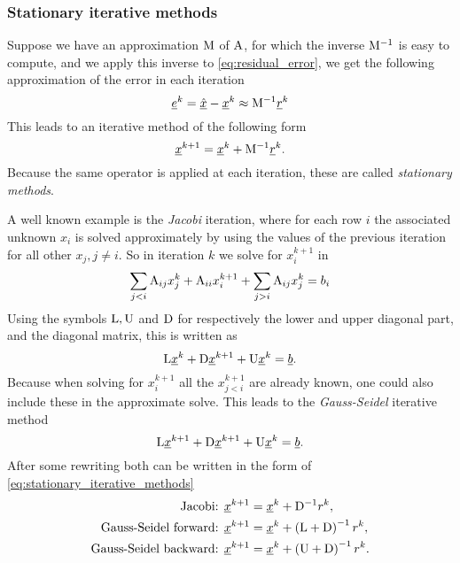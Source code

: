 \subsubsection{Stationary iterative methods} \label{sec:stationary_iterative_methods}
Suppose we have an approximation $\mathrm{M}$ of $\mathrm{A}$, for which 
the inverse $\mathrm{M}^{-1}$ is easy to compute, and we apply this inverse
to \eqref{eq:residual_error}, we get the following approximation of the
error in each iteration
\begin{equation}
  \underline{e}^k=\underline{\hat x}-\underline{x}^k \approx \mathrm{M}^{-1}\underline{r}^k
    \label{eq:iterative_solver_error_estimate}
\end{equation}
This leads to an iterative method of the following form
\begin{equation}\label{eq:stationary_iterative_methods}
  \underline{x}^{k+1}=\underline{x}^{k} + \mathrm{M}^{-1} \underline{r}^{k}.
\end{equation}
Because the same operator is applied at each iteration, these are 
called \emph{stationary methods}.

A well known example is the
\emph{Jacobi} iteration, where for each row $i$ the associated unknown $x_i$ 
is solved approximately by using the values of the previous iteration 
for all other $x_j, j\neq i$. So in iteration $k$ we solve for $x^{k+1}_i$ in
\begin{equation*}
  \sum_{j<i} \mathrm{A}_{ij} x^k_j + \mathrm{A}_{ii} x^{k+1}_i +
  \sum_{j>i} \mathrm{A}_{ij} x^k_j = b_i
\end{equation*}
Using the symbols $\mathrm{L}, \mathrm{U}$ and $\mathrm{D}$ for respectively 
the lower and upper diagonal part, and the diagonal matrix, 
this is written as
\begin{equation*}
  \mathrm{L} \underline{x}^k +
  \mathrm{D} \underline{x}^{k+1} +
  \mathrm{U} \underline{x}^k = \underline{b}.
\end{equation*}
Because when solving for $x^{k+1}_i$ all the $x^{k+1}_{j<i}$ are already 
known, one could also include these in the approximate solve. This leads 
to the \emph{Gauss-Seidel} iterative method
\begin{equation*}
  \mathrm{L} \underline{x}^{k+1} +
  \mathrm{D} \underline{x}^{k+1} +
  \mathrm{U} \underline{x}^k = \underline{b}.
\end{equation*}
After some rewriting both can be written in the form of 
\eqref{eq:stationary_iterative_methods}
\begin{equation}
\begin{split}
  \text{Jacobi:   } & \underline{x}^{k+1}=\underline{x}^k + \mathrm{D}^{-1} r^k, \\
  \text{Gauss-Seidel forward:  } & \underline{x}^{k+1}=\underline{x}^k + \left(\mathrm{L}+\mathrm{D}\right)^{-1} r^k, \\
  \text{Gauss-Seidel backward: } & \underline{x}^{k+1}=\underline{x}^k + \left(\mathrm{U}+\mathrm{D}\right)^{-1} r^k.
\end{split}
\end{equation}

